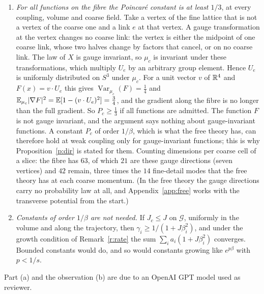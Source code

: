 \begin{remark}\label{r:gaugedir}
\leavevmode
\begin{enumerate}
\item[(a)] \emph{For all functions on the fibre the Poincar\'e constant is at least $1/3$}, at every
coupling, volume and coarse field. Take a vertex of the fine lattice that is not a vertex of the coarse one
and a link $e$ at that vertex. A gauge transformation at the vertex changes no coarse link: the vertex is
either the midpoint of one coarse link, whose two halves change by factors that cancel, or on no coarse link.
The law of $X$ is gauge invariant, so $\mu_c$ is invariant under these transformations, which multiply
$U_e$ by an arbitrary group element. Hence $U_e$ is uniformly distributed on $S^3$ under $\mu_c$. For a unit
vector $v$ of $\mathbb{R}^4$ and $F(x)=v\cdot U_e$ this gives $\operatorname{Var}_{\mu_c}(F)=\tfrac14$ and
$\mathbb{E}_{\mu_c}|\nabla F|^2=\mathbb{E}[1-(v\cdot U_e)^2]=\tfrac34$, and the gradient along the fibre is no longer than the
full gradient. So $P_c\ge\tfrac13$ if all functions are admitted. The function $F$ is not gauge invariant,
and the argument says nothing about gauge-invariant functions. A constant $P_c$ of order $1/\beta$, which is
what the free theory has, can therefore hold at weak coupling only for gauge-invariant functions; this is
why Proposition~\ref{p:dir} is stated for them. Counting dimensions per coarse cell of a slice: the fibre has
$63$, of which $21$ are these gauge directions (seven vertices) and $42$ remain, three times the $14$
fine-detail modes that the free theory has at each coarse momentum. (In the free theory the gauge directions carry no
probability law at all, and Appendix~\ref{app:free} works with the transverse potential from the start.)
\item[(b)] \emph{Constants of order $1/\beta$ are not needed.} If $J_c\le J$ on $\mathcal G$, uniformly in
the volume and along the trajectory, then $\gamma_i\ge1/(1+J\beta_i^2)$, and under the growth condition of
Remark~\ref{r:rate} the sum $\sum_ia_i(1+J\beta_i^2)$ converges. Bounded constants would do, and so would
constants growing like $e^{p\beta}$ with $p<1/s$.
\end{enumerate}
Part (a) and the observation (b) are due to an OpenAI GPT model used as reviewer.
\end{remark}

